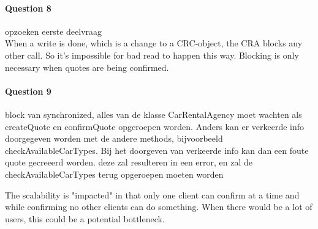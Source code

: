 \documentclass{ds-report}
\begin{document}
	\paragraph{Question 8} 
	opzoeken eerste deelvraag\\
	When a write is done, which is a change to a CRC-object, the CRA blocks any other call. So it's impossible for bad read to happen this way. Blocking is only necessary when quotes are being confirmed.
	
	\paragraph{Question 9} 
	block van synchronized, alles van de klasse CarRentalAgency moet wachten als createQuote en confirmQuote opgeroepen worden. 
	Anders kan er verkeerde info doorgegeven worden met de andere methods, bijvoorbeeld checkAvailableCarTypes. 
	Bij het doorgeven van verkeerde info kan dan een foute quote gecreeerd worden. deze zal resulteren in een error, en zal de checkAvailableCarTypes terug
	opgeroepen moeten worden 
	
	The scalability is "impacted" in that only one client can confirm at a time and while confirming no other clients can do something. When there would be a lot of users, this could be a potential bottleneck. 
	
	\clearpage
	
	
\end{document}
